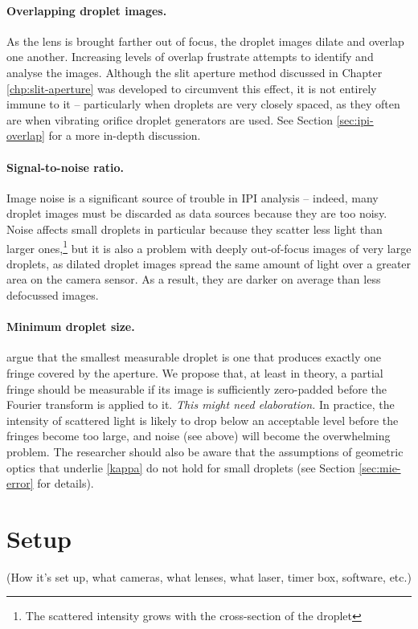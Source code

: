 \documentclass[11.5pt]{book}
\begin{document}
\paragraph{Overlapping droplet images.}
As the lens is brought farther out of focus, the droplet images dilate and
overlap one another. Increasing levels of overlap frustrate attempts to identify
and analyse the images. Although the slit aperture method discussed in Chapter
\ref{chp:slit-aperture} was developed to circumvent this effect, it is not
entirely immune to it -- particularly when droplets are very closely spaced, as
they often are when vibrating orifice droplet generators are used. See Section
\ref{sec:ipi-overlap} for a more in-depth discussion.

\paragraph{Signal-to-noise ratio.}
Image noise is a significant source of trouble in IPI analysis -- indeed, many
droplet images must be discarded as data sources because they are too noisy.
Noise affects small droplets in particular because they scatter less light than
larger ones,\footnote{The scattered intensity grows with the cross-section of
the droplet} but it is also a problem with deeply out-of-focus images of very
large droplets, as dilated droplet images spread the same amount of light over a
greater area on the camera sensor. As a result, they are darker on average than
less defocussed images. 

\paragraph{Minimum droplet size.}
\citet{Damaschke02} argue that the smallest measurable droplet is one that
produces exactly one fringe covered by the aperture. We propose that, at least
in theory, a partial fringe should be measurable if its image is sufficiently
zero-padded before the Fourier transform is applied to it. \emph{This might need
elaboration.} In practice, the intensity of scattered light is likely to drop
below an acceptable level before the fringes become too large, and noise (see
above) will become the overwhelming problem. The researcher should also be aware
that the assumptions of geometric optics that underlie \eqref{kappa} do
not hold for small droplets (see Section \ref{sec:mie-error} for details).

\section{Setup}
\label{sec:ipi-setup}
(How it's set up, what cameras, what lenses, what laser, timer box, software,
etc.)
\end{document}
